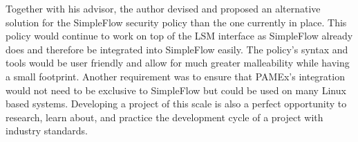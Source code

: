 Together with his advisor, the author devised and proposed an 
alternative solution for the SimpleFlow security policy than the 
one currently in place. This policy would continue to work on top 
of the LSM interface as SimpleFlow already does and therefore be 
integrated into SimpleFlow easily. The policy’s syntax and 
tools would be user friendly and allow for much greater malleability 
while having a small footprint. Another requirement was to ensure 
that PAMEx's integration would not need to be exclusive 
to SimpleFlow but could be used on many Linux based systems. Developing 
a project of this scale is also a perfect opportunity to research, learn about, and practice the development cycle of 
a project with industry standards.  

